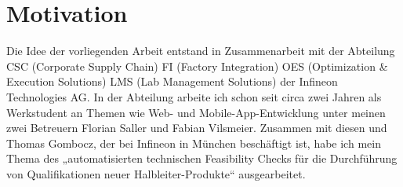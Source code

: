 \section{Motivation}
Die Idee der vorliegenden Arbeit entstand in Zusammenarbeit mit der Abteilung CSC (Corporate Supply Chain) FI (Factory Integration) OES (Optimization \& Execution Solutions) LMS (Lab Management Solutions) der Infineon Technologies AG. 
In der Abteilung arbeite ich schon seit circa zwei Jahren als Werkstudent an Themen wie Web- und Mobile-App-Entwicklung unter meinen zwei Betreuern Florian Saller und Fabian Vilsmeier.
Zusammen mit diesen und Thomas Gombocz, der bei Infineon in München beschäftigt ist, habe ich mein Thema des „automatisierten technischen Feasibility Checks für die Durchführung von Qualifikationen neuer Halbleiter-Produkte“ ausgearbeitet.